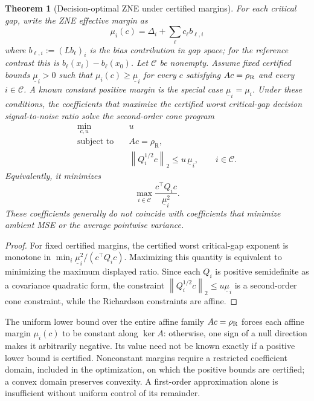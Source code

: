 \documentclass[a4paper,onecolumn,unpublished,nopdfoutputerror]{quantumarticle}
\theoremstyle{plain}
\newtheorem{theorem}{Theorem}[section]
\theoremstyle{definition}
\newcommand{\calC}{\mathcal{C}}
\newcommand{\norm}[1]{\left\lVert #1\right\rVert}
\newcommand{\1}{\mathbf{1}}
\begin{document}
\begin{theorem}[Decision-optimal ZNE under certified margins]
\label{thm:decision_optimal_zne}
For each critical gap, write the ZNE effective margin as
\begin{equation}
    \mu_i(c)=\Delta_i+\sum_\ell c_\ell b_{\ell,i}
\end{equation}
where $b_{\ell,i}:=(Lb_\ell)_i$ is the bias contribution in gap space; for the reference contrast this is $b_\ell(x_i)-b_\ell(x_0)$.  Let $\calC$ be nonempty. Assume fixed certified bounds $\underline\mu_i>0$ such that $\mu_i(c)\ge\underline\mu_i$ for every $c$ satisfying $Ac=\rho_{\rm R}$ and every $i\in\calC$. A known constant positive margin is the special case $\underline\mu_i=\mu_i$. Under these conditions, the coefficients that maximize the certified worst critical-gap decision signal-to-noise ratio solve the second-order cone program
\begin{equation}
\label{eq:decision_opt_zne_socp}
\begin{aligned}
    \min_{c,u}\quad & u \\
    \text{subject to}\quad
        & A c=\rho_{\mathrm R},\\
        & \norm{Q_i^{1/2}c}_2\le u\,\underline\mu_i,
        \qquad i\in\calC .
\end{aligned}
\end{equation}
Equivalently, it minimizes
\begin{equation}
    \max_{i\in\calC}\frac{c^\top Q_i c}{\underline\mu_i^2}.
\end{equation}
These coefficients generally do not coincide with coefficients that minimize ambient MSE or the average pointwise variance.
\end{theorem}

\begin{proof}
For fixed certified margins, the certified worst critical-gap exponent is monotone in $\min_i \underline\mu_i^2/(c^\top Q_i c)$.  Maximizing this quantity is equivalent to minimizing the maximum displayed ratio.  Since each $Q_i$ is positive semidefinite as a covariance quadratic form, the constraint $\norm{Q_i^{1/2}c}_2\le u\underline\mu_i$ is a second-order cone constraint, while the Richardson constraints are affine.
\end{proof}

The uniform lower bound over the entire affine family $Ac=\rho_{\rm R}$ forces each affine margin $\mu_i(c)$ to be constant along $\ker A$: otherwise, one sign of a null direction makes it arbitrarily negative. Its value need not be known exactly if a positive lower bound is certified. Nonconstant margins require a restricted coefficient domain, included in the optimization, on which the positive bounds are certified; a convex domain preserves convexity. A first-order approximation alone is insufficient without uniform control of its remainder.
\end{document}
